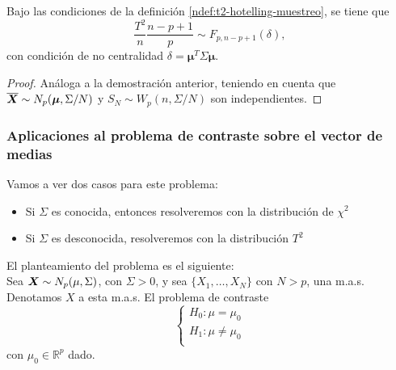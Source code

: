 \begin{nprop}
  Bajo las condiciones de la definición \ref{ndef:t2-hotelling-muestreo}, se tiene que
  \[
    \frac{T^2}{n}\frac{n-p+1}{p} \sim F_{p, n-p+1}(\delta),
  \]
  con condición de no centralidad \(\delta = \boldsymbol \mu^T \Sigma \boldsymbol \mu\).
\end{nprop}

\begin{proof}
  Análoga a la demostración anterior, teniendo  en cuenta que \(\overline{\boldsymbol{X}} \sim N_p(\boldsymbol \mu, \Sigma/N)\) y \(S_N \sim W_p(n, \Sigma/N)\) son independientes.
\end{proof}

\subsubsection{Aplicaciones al problema de contraste sobre el vector de medias}

Vamos a ver dos casos para este problema:
\begin{itemize}
\item Si $\Sigma$ es conocida, entonces resolveremos con la distribución de $\chi^2$
  \item Si $\Sigma$ es desconocida, resolveremos con la distribución $T^2$
\end{itemize}

El planteamiento del problema es el siguiente:\\

Sea $\boldsymbol{X}\sim N_p(\mu,\Sigma)$, con $\Sigma > 0$, y sea $\{X_1,\dots,X_N\}$ con $N>p$, una m.a.s. Denotamos $X$ a esta m.a.s. El problema de contraste
\[
\begin{cases}
  H_0 : \mu = \mu_0\\
  H_1 : \mu \ne \mu_0\\
\end{cases}
\]
con $\mu_0 \in \mathbb R ^p$ dado.

